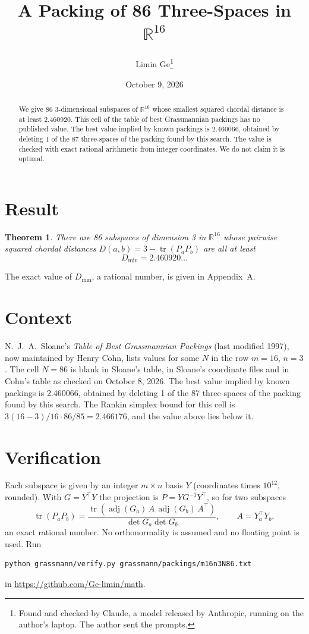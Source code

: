 \documentclass[11pt,a4paper]{article}
\title{A Packing of 86 Three-Spaces in $\mathbb{R}^{16}$}
\author{Limin Ge\thanks{Found and checked by Claude, a model released by Anthropic, running on the author's laptop. The author sent the prompts.}}
\date{October 9, 2026}
\newtheorem*{theorem}{Theorem}
\begin{document}
\maketitle
\begin{abstract}
We give 86 3-dimensional subspaces of $\mathbb{R}^{16}$ whose smallest squared chordal distance is at least 2.460920. This cell of the table of best Grassmannian packings has no published value. The best value implied by known packings is 2.460066, obtained by deleting 1 of the 87 three-spaces of the packing found by this search. The value is checked with exact rational arithmetic from integer coordinates. We do not claim it is optimal.
\end{abstract}

\section{Result}
\begin{theorem}
There are 86 subspaces of dimension 3 in $\mathbb{R}^{16}$ whose pairwise squared chordal distances $D(a,b) = 3 - \operatorname{tr}(P_aP_b)$ are all at least
\[ D_{\min} = 2.460920\ldots \]
\end{theorem}
The exact value of $D_{\min}$, a rational number, is given in Appendix~A.


\section{Context}
N.~J.~A.~Sloane's \emph{Table of Best Grassmannian Packings} (last modified 1997), now maintained by Henry Cohn, lists values for some $N$ in the row $m=16$, $n=3$. The cell $N=86$ is blank in Sloane's table, in Sloane's coordinate files and in Cohn's table as checked on October 8, 2026. The best value implied by known packings is 2.460066, obtained by deleting 1 of the 87 three-spaces of the packing found by this search. The Rankin simplex bound for this cell is $3(16-3)/16\cdot 86/85 = 2.466176$, and the value above lies below it.


\section{Verification}
Each subspace is given by an integer $m\times n$ basis $Y$ (coordinates times $10^{12}$, rounded). With $G=Y^\top Y$ the projection is $P=YG^{-1}Y^\top$, so for two subspaces
\[ \operatorname{tr}(P_aP_b)=\frac{\operatorname{tr}(\operatorname{adj}(G_a)\,A\,\operatorname{adj}(G_b)\,A^\top)}{\det G_a\det G_b},\qquad A=Y_a^\top Y_b, \]
an exact rational number. No orthonormality is assumed and no floating point is used. Run
\begin{verbatim}
python grassmann/verify.py grassmann/packings/m16n3N86.txt
\end{verbatim}
in \url{https://github.com/Ge-limin/math}.
\end{document}
